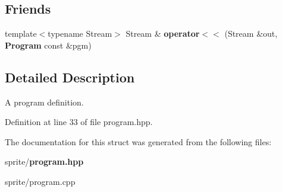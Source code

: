 \subsection*{Friends}
\begin{CompactItemize}
\item 
template$<$typename Stream$>$ Stream \& {\bf operator$<$$<$} (Stream \&out, {\bf Program} const \&pgm)\label{structsprite_1_1Program_n0}

\end{CompactItemize}


\subsection{Detailed Description}
A program definition. 



Definition at line 33 of file program.hpp.

The documentation for this struct was generated from the following files:\begin{CompactItemize}
\item 
sprite/{\bf program.hpp}\item 
sprite/program.cpp\end{CompactItemize}
